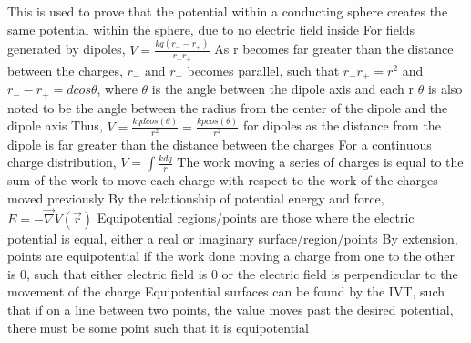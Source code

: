 \documentclass[11 pt, twoside]{article}
\newenvironment{outline*}
{
	\begin{outline}[enumerate]
	}
	{\end{outline}
}
\begin{document}
\begin{outline*}
\3 This is used to prove that the potential within a conducting sphere creates the same potential within the sphere, due to no electric field inside
\2 For fields generated by dipoles, $V = \frac{kq(r_- - r_+)}{r_-r_+}$
\3 As r becomes far greater than the distance between the charges, $r_-$ and $r_+$ becomes parallel, such that $r_-r_+ = r^2$ and $r_- - r_+ = dcos\theta$, where $\theta$ is the angle between the dipole axis and each r
\4 $\theta$ is also noted to be the angle between the radius from the center of the dipole and the dipole axis
\3 Thus, $V = \frac{kqdcos(\theta)}{r^2} = \frac{kpcos(\theta)}{r^2}$ for dipoles as the distance from the dipole is far greater than the distance between the charges
\2 For a continuous charge distribution, $V = \int \frac{kdq}{r}$
\1 The work moving a series of charges is equal to the sum of the work to move each charge with respect to the work of the charges moved previously
\1 By the relationship of potential energy and force, $E = -\vec{\nabla} V(\vec{r})$
\1 Equipotential regions/points are those where the electric potential is equal, either a real or imaginary surface/region/points
\2 By extension, points are equipotential if the work done moving a charge from one to the other is 0, such that either electric field is 0 or the electric field is perpendicular to the movement of the charge
\2 Equipotential surfaces can be found by the IVT, such that if on a line between two points, the value moves past the desired potential, there must be some point such that it is equipotential
\end{outline*}
\end{document}
